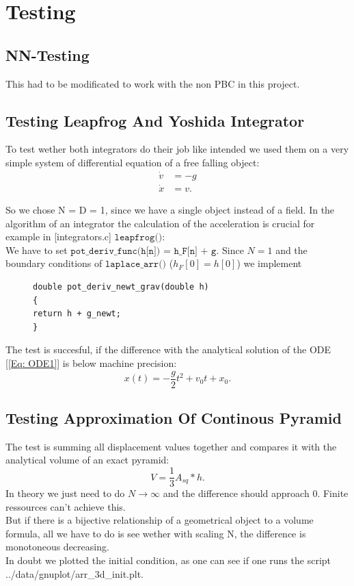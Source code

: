 \documentclass[11pt,a4paper]{article}
\begin{document}
\section{Testing}

\subsection{NN-Testing}

This had to be modificated to work with the non PBC in this project.

\subsection{Testing Leapfrog And Yoshida Integrator}

To test wether both integrators do their job like intended we used them on a very simple system of differential equation of a free falling object:
\begin{align}\label{Eq: ODE1}
\dot{v} &= -g \\
\dot{x} &= v.
\end{align}

So we chose N = D = 1, since we have a single object instead of a field. In the algorithm of an integrator the calculation of the acceleration is crucial for example in [integrators.c] $\texttt{leapfrog()}:$ \\
We have to set $\texttt{pot\_deriv\_func(h[n]) =  h\_F[n] + g}$. Since $N = 1$ and the boundary conditions of $\texttt{laplace\_arr()}$ ($ h_{F}[0] = h[0]$) we implement

\begin{figure}[H]
\begin{lstlisting}
double pot_deriv_newt_grav(double h)
{
return h + g_newt;
}
\end{lstlisting}
\end{figure}
The test is succesful, if the difference with the analytical solution of the ODE [\ref{Eq: ODE1}] is below machine precision:
\begin{equation}
x(t) = -\frac{g}{2} t^{2} + v_{0} t + x_{0}.
\end{equation}

\subsection{Testing Approximation Of Continous Pyramid}

The test is summing all displacement values together and compares it with the analytical volume of an exact pyramid:
\begin{equation}
V = \frac{1}{3} A_{sq} * h.
\end{equation} 
In theory we just need to do $N \rightarrow \infty$ and the difference should approach $0$. Finite ressources can't achieve this.\\
But if there is a bijective relationship of a geometrical object to a volume formula, all we have to do is see wether with scaling N, the difference is monotoneous decreasing. \\
In doubt we plotted the initial condition, as one can see if one runs the script ../data/gnuplot/arr\_3d\_init.plt.\\
\end{document}
